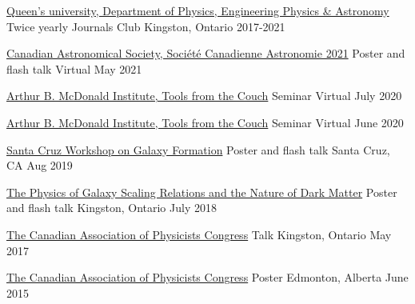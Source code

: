 \begin{cvhonors}
  \cvhonor
    {\href{https://www.queensu.ca/physics/}{Queen's university, Department of Physics, Engineering Physics \& Astronomy}} %
    {Twice yearly Journals Club} %
    {Kingston, Ontario} %
    {2017-2021} %

  \cvhonor
    {\href{https://casca2021.astroherzberg.org/}{Canadian Astronomical Society, Société Canadienne Astronomie 2021}} %
    {Poster and flash talk} %
    {Virtual} %
    {May 2021} %

  \cvhonor
    {\href{https://mcdonaldinstitute.ca/professional-development/tools-from-the-couch/}{Arthur B. McDonald Institute, Tools from the Couch}} %
    {Seminar} %
    {Virtual} %
    {July 2020} %
    
  \cvhonor
    {\href{https://mcdonaldinstitute.ca/professional-development/tools-from-the-couch/}{Arthur B. McDonald Institute, Tools from the Couch}} %
    {Seminar} %
    {Virtual} %
    {June 2020} %
    
  \cvhonor
    {\href{http://hipacc.ucsc.edu/GalaxyWorkshop2019.html}{Santa Cruz Workshop on Galaxy Formation}} %
    {Poster and flash talk} %
    {Santa Cruz, CA} %
    {Aug 2019} %
    
  \cvhonor
    {\href{https://darkmatter2018.weebly.com/}{The Physics of Galaxy Scaling Relations and the Nature of Dark Matter}} %
    {Poster and flash talk} %
    {Kingston, Ontario} %
    {July 2018} %

  \cvhonor
    {\href{https://www.cap.ca/congress-conference/past-congress/congress-2017/}{The Canadian Association of Physicists Congress}} %
    {Talk} %
    {Kingston, Ontario} %
    {May 2017} %

    
  \cvhonor
    {\href{https://www.cap.ca/congress-conference/past-congress/congress-2015/}{The Canadian Association of Physicists Congress}} %
    {Poster} %
    {Edmonton, Alberta} %
    {June 2015} %
        
\end{cvhonors}